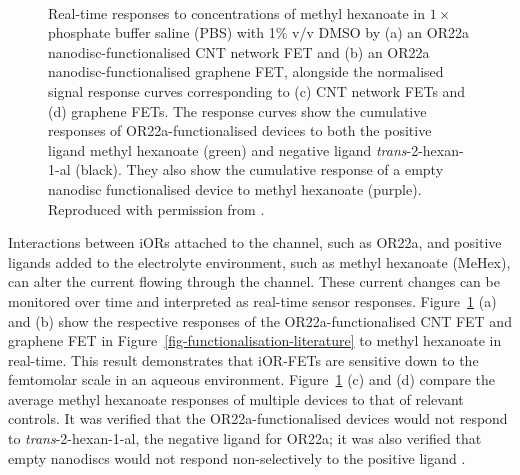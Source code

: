 \documentclass[
  a4paper,
]{scrbook}
\begin{document}
\begin{figure}
\begin{minipage}[t]{0.45\linewidth}
{{}

}

\end{minipage}%
%
\begin{minipage}[t]{0.01\linewidth}

{\centering 

~

}

\end{minipage}%

\caption{\label{fig-iOR-sensing-literature}Real-time responses to
concentrations of methyl hexanoate in \(1 \times\) phosphate buffer
saline (PBS) with 1\% v/v DMSO by (a) an OR22a nanodisc-functionalised
CNT network FET and (b) an OR22a nanodisc-functionalised graphene FET,
alongside the normalised signal response curves corresponding to (c) CNT
network FETs and (d) graphene FETs. The response curves show the
cumulative responses of OR22a-functionalised devices to both the
positive ligand methyl hexanoate (green) and negative ligand
\emph{trans}-2-hexan-1-al (black). They also show the cumulative
response of a empty nanodisc functionalised device to methyl hexanoate
(purple). Reproduced with permission from
\autocite{Murugathas2019a,Murugathas2020}.}

\end{figure}

Interactions between iORs attached to the channel, such as OR22a, and
positive ligands added to the electrolyte environment, such as methyl
hexanoate (MeHex), can alter the current flowing through the channel.
These current changes can be monitored over time and interpreted as
real-time sensor responses. Figure~\ref{fig-iOR-sensing-literature} (a)
and (b) show the respective responses of the OR22a-functionalised CNT
FET and graphene FET in Figure~\ref{fig-functionalisation-literature} to
methyl hexanoate in real-time. This result demonstrates that iOR-FETs
are sensitive down to the femtomolar scale in an aqueous environment.
Figure~\ref{fig-iOR-sensing-literature} (c) and (d) compare the average
methyl hexanoate responses of multiple devices to that of relevant
controls. It was verified that the OR22a-functionalised devices would
not respond to \emph{trans}-2-hexan-1-al, the negative ligand for OR22a;
it was also verified that empty nanodiscs would not respond
non-selectively to the positive ligand
\autocite{Murugathas2019a,Murugathas2020}.
\end{document}
